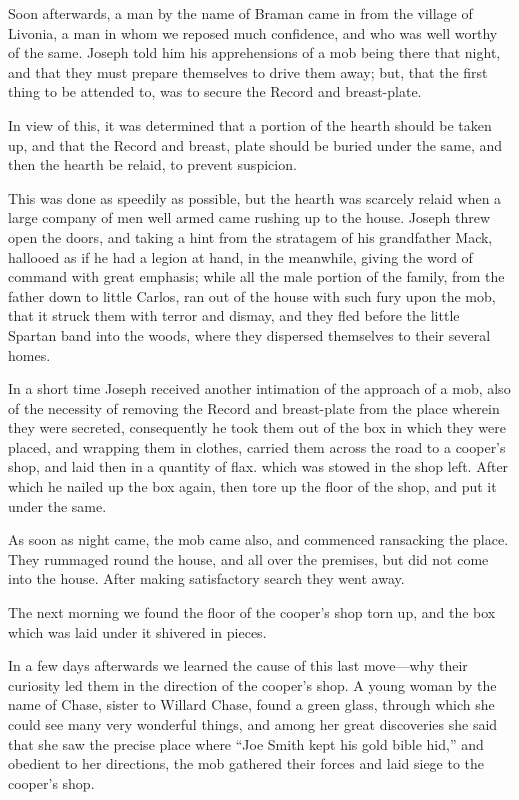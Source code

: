 		Soon afterwards, a man by the name of Braman came in from the village of Livonia, a man in whom we reposed much confidence, and who was well worthy of the same. Joseph told him his apprehensions of a mob being there that night, and that they must prepare themselves to drive them away; but, that the first thing to be attended to, was to secure the Record and breast-plate.

		In view of this, it was determined that a portion of the hearth should be taken up, and that the Record and breast, plate should be buried under the same, and then the hearth be relaid, to prevent suspicion.

		This was done as speedily as possible, but the hearth was scarcely relaid when a large company of men well armed came rushing up to the house. Joseph threw open the doors, and taking a hint from the stratagem of his grandfather Mack, hallooed as if he had a legion at hand, in the meanwhile, giving the word of command with great emphasis; while all the male portion of the family, from the father down to little Carlos, ran out of the house with such fury upon the mob, that it struck them with terror and dismay, and they fled before the little Spartan band into the woods, where they dispersed themselves to their several homes.

		In a short time Joseph received another intimation of the approach of a mob, also of the necessity of removing the Record and breast-plate from the place wherein they were secreted, consequently he took them out of the box in which they were placed, and wrapping them in clothes, carried them across the road to a cooper's shop, and laid then in a quantity of flax. which was stowed in the shop left. After which he nailed up the box again, then tore up the floor of the shop, and put it under the same.

		 As soon as night came, the mob came also, and	commenced ransacking the place. They rummaged round the house, and all over the premises, but did not come into the house. After making satisfactory search they went away.

		The next morning we found the floor of the cooper's shop torn up, and the box which was laid under it shivered in pieces.

		In a few days afterwards we learned the cause of this last move---why their curiosity led them in the direction of the cooper's shop. A young woman by the name of Chase, sister to Willard Chase, found a green glass, through which she could see many very wonderful things, and among her great discoveries she said that she saw the precise place where ``Joe Smith kept his gold bible hid,'' and obedient to her directions, the mob gathered their forces and laid siege to the cooper's shop.

